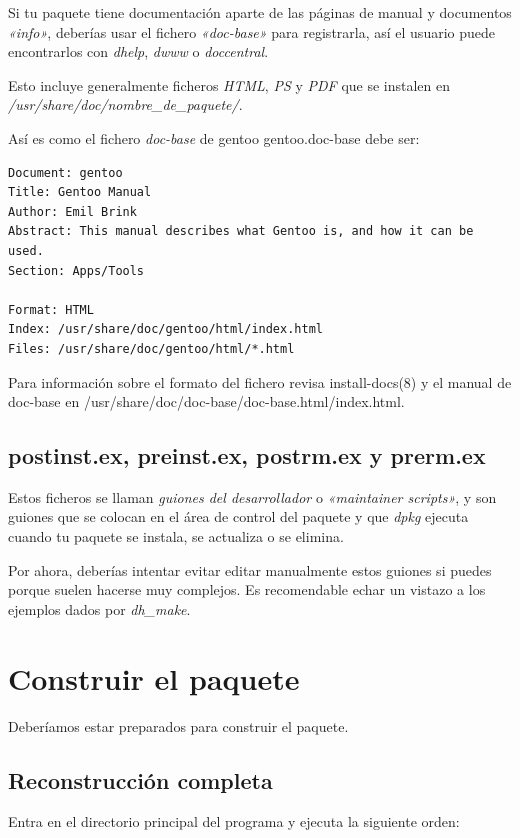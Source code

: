 \documentclass[letterpaper,12pt,spanish]{manual}
\begin{document}
Si tu paquete tiene documentación aparte de las páginas de manual y documentos \emph{«info»}, deberías usar el fichero \emph{«doc-base»} para registrarla, así el usuario puede encontrarlos con \emph{dhelp}, \emph{dwww} o \emph{doccentral}.

Esto incluye generalmente ficheros \emph{HTML}, \emph{PS} y \emph{PDF} que se instalen en \emph{/usr/share/doc/nombre\_de\_paquete/}.

Así es como el fichero \emph{doc-base} de gentoo gentoo.doc-base debe ser:

\begin{Verbatim}[commandchars=@\[\]]
Document: gentoo
Title: Gentoo Manual
Author: Emil Brink
Abstract: This manual describes what Gentoo is, and how it can be used.
Section: Apps/Tools

Format: HTML
Index: /usr/share/doc/gentoo/html/index.html
Files: /usr/share/doc/gentoo/html/*.html
\end{Verbatim}

Para información sobre el formato del fichero revisa install-docs(8) y el manual de doc-base en /usr/share/doc/doc-base/doc-base.html/index.html.


\subsection{postinst.ex, preinst.ex, postrm.ex y prerm.ex}

Estos ficheros se llaman \emph{guiones del desarrollador}  o \emph{«maintainer scripts»}, y son guiones que se colocan en el área de control del paquete y que \emph{dpkg} ejecuta cuando tu paquete se instala, se actualiza o se elimina.

Por ahora, deberías intentar evitar editar manualmente estos guiones si puedes porque suelen hacerse muy complejos. Es recomendable echar un vistazo a los ejemplos dados por \emph{dh\_make}.


\section{\textbf{Construir el paquete}}

Deberíamos estar preparados para construir el paquete.


\subsection{Reconstrucción completa}

Entra en el directorio principal del programa y ejecuta la siguiente orden:
\end{document}
